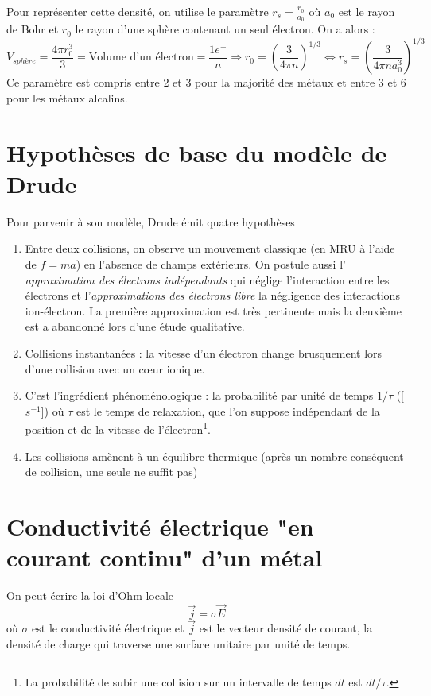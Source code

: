	\noindent
	Pour représenter cette densité, on utilise le paramètre $ r_s = \frac{r_0}{a_0}$
	où $a_0$ est le rayon de Bohr et $r_0$ le rayon d'une sphère contenant un seul 
	électron. On a alors : 
	\begin{equation}
	V_{sphère} = \frac{4\pi r^3_0}{3} = \text{Volume d'un électron} = \frac{1 e^-}{n} 
	\Longrightarrow r_0 = \left(\frac{3}{4\pi n}\right)^{1/3} \Longleftrightarrow r_s 
	= \left(\frac{3}{4\pi n a_0^3}\right)^{1/3}
	\end{equation}
	Ce paramètre est compris entre 2 et 3 pour la majorité des métaux et entre 3 et 6 
	pour les métaux alcalins.
	
\newpage
\section{Hypothèses de base du modèle de Drude}
Pour parvenir à son modèle, Drude émit quatre hypothèses

\begin{enumerate}
\item Entre deux collisions, on observe un mouvement classique (en MRU à l'aide 
de $f = ma$) en l'absence de champs extérieurs. On postule aussi l'\textit{
approximation des électrons indépendants} qui néglige l'interaction entre les 
électrons et l'\textit{approximations des électrons libre} la négligence des 
interactions ion-électron. La première approximation est très pertinente mais 
la deuxième est a abandonné lors d'une étude qualitative.

\item Collisions instantanées : la vitesse d'un électron change brusquement 
lors d'une collision avec un cœur ionique.
		
\item C'est l'ingrédient phénoménologique : la probabilité par unité de temps 
$1/\tau$ ([$s^{-1}$]) où $\tau$ est le temps de relaxation, que l'on suppose 
indépendant de la position et de la vitesse de l'électron\footnote{La probabilité 
de subir une collision sur un intervalle de temps $dt$ est $dt/\tau$.}.

\item Les collisions amènent à un équilibre thermique (après un nombre conséquent 
de collision, une seule ne suffit pas)
\end{enumerate}


\section{Conductivité électrique "en courant continu" d'un métal}
On peut écrire la loi d'Ohm locale 
\begin{equation}
\vec{j} = \sigma\vec{E}
\end{equation}
où $\sigma$ est le conductivité électrique et $\vec{j}$ est le vecteur densité de 
courant, la densité de charge qui traverse une surface unitaire par unité de temps.\\

